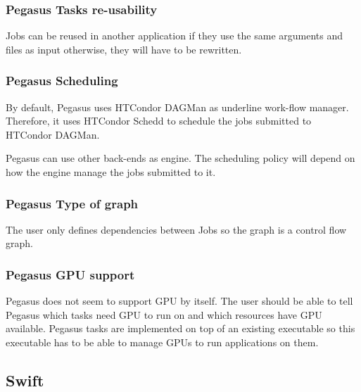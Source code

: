 \subsubsection{Pegasus Tasks re-usability}
Jobs can be reused in another application if they use the same arguments and files as input otherwise, they will have to be rewritten.


\subsubsection{Pegasus Scheduling}
By default, Pegasus uses HTCondor DAGMan \cite{ThaTL2002} as underline work-flow manager.
Therefore, it uses HTCondor Schedd to schedule the jobs submitted to HTCondor DAGMan.

Pegasus can use  other back-ends as engine.
The scheduling policy will depend on how the engine manage the jobs submitted to it.


\subsubsection{Pegasus Type of graph}
The user only defines dependencies between Jobs so the graph is a control flow graph.

\subsubsection{Pegasus GPU support}
Pegasus does not seem to support GPU by itself.
The user should be able to tell Pegasus which tasks need GPU to run on and which resources have GPU available.
Pegasus tasks are implemented on top of an existing executable so this executable has to be able to manage GPUs to run applications on them.



\subsection{Swift}
